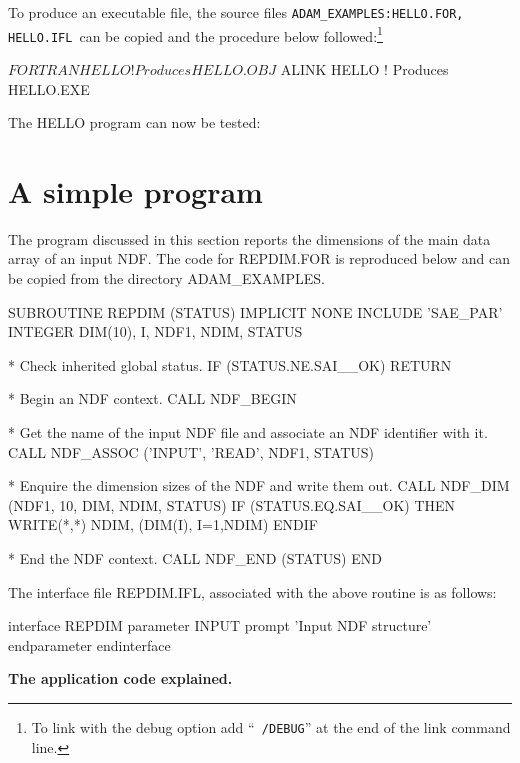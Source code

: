 \documentclass[twoside,11pt,nolof]{starlink}
\begin{document}
To produce an executable file, the
source files \texttt{ADAM\_EXAMPLES:HELLO.FOR, HELLO.IFL}\ can be copied and the
procedure below  followed:\footnote{To link with the debug option add
``\texttt{~/DEBUG}'' at the end of the link
command line.}
\begin{terminalv}
$ FORTRAN HELLO                                       ! Produces HELLO.OBJ
$ ALINK HELLO                                         ! Produces HELLO.EXE
\end{terminalv}
The HELLO program can now be tested:

\newpage
\section{A simple program\label{repdim}}

The program discussed in this section reports the
dimensions of the main data array of an input NDF.
The code for REPDIM.FOR is reproduced below and can be copied from the
directory ADAM\_EXAMPLES.
\begin{terminalv}
      SUBROUTINE REPDIM (STATUS)
      IMPLICIT NONE
      INCLUDE 'SAE_PAR'
      INTEGER DIM(10), I, NDF1, NDIM, STATUS

*   Check inherited global status.
      IF (STATUS.NE.SAI__OK) RETURN

*   Begin an NDF context.
      CALL NDF_BEGIN

*   Get the name of the input NDF file and associate an NDF identifier with it.
      CALL NDF_ASSOC ('INPUT', 'READ', NDF1, STATUS)

*   Enquire the dimension sizes of the NDF and write them out.
      CALL NDF_DIM (NDF1, 10, DIM, NDIM, STATUS)
      IF (STATUS.EQ.SAI__OK) THEN
         WRITE(*,*) NDIM, (DIM(I), I=1,NDIM)
      ENDIF

*   End the NDF context.
      CALL NDF_END (STATUS)
      END
\end{terminalv}

The interface file REPDIM.IFL, associated with the above routine is
as follows:
\begin{terminalv}
interface REPDIM
  parameter      INPUT
     prompt      'Input NDF structure'
  endparameter
endinterface
\end{terminalv}


\textbf{\large The application code explained.}
\end{document}
